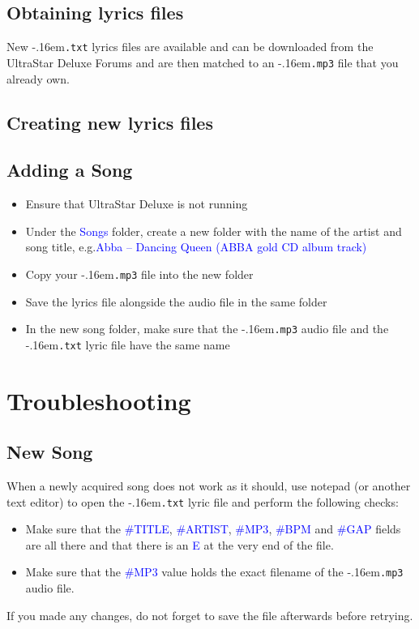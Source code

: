 \documentclass{scrreprt}
\newcommand*\fileending[1]{\texorpdfstring{\kern-.16em\texttt{#1}}{#1}}
\newcommand*\todomu[1]{\textcolor{blue}{#1}}
\begin{document}
\section{Obtaining lyrics files}
New \fileending{.txt} lyrics files are available
and can be downloaded from the UltraStar Deluxe Forums
and are then matched to an \fileending{.mp3} file that you already own.

\section{Creating new lyrics files}

\section{Adding a Song}
\begin{itemize}
\item Ensure that UltraStar Deluxe is not running
\item Under the \todomu{Songs} folder,
	create a new folder with the name of the artist and song title,
	e.g.\@ \todomu{Abba – Dancing Queen (ABBA gold CD album track)}
\item Copy your \fileending{.mp3} file into the new folder
\item Save the lyrics file alongside the audio file in the same folder
\item In the new song folder,
	make sure that the \fileending{.mp3} audio file
	and the \fileending{.txt} lyric file have the same name
\end{itemize}

\chapter{Troubleshooting}

\section{New Song}

When a newly acquired song does not work as it should,
use notepad (or another text editor) to open the \fileending{.txt} lyric file
and perform the following checks:
\begin{itemize}
\item Make sure that the \todomu{\#TITLE}, \todomu{\#ARTIST}, \todomu{\#MP3},
	\todomu{\#BPM} and \todomu{\#GAP} fields
	are all there
	and that there is an \todomu{E}
	at the very end of the file.
\item Make sure that the \todomu{\#MP3} value
	holds the exact filename of the \fileending{.mp3} audio file.
\end{itemize}
If you made any changes,
do not forget to save the file afterwards before retrying.
\end{document}
